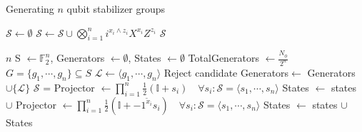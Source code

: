 \documentclass{standalone}
\begin{document}
\begin{algorithm}
\caption{Generating $n$ qubit stabilizer groups}
\label{alg:gengroups}
\begin{algorithmic}
    \State $\mathcal{S}\leftarrow\emptyset$
        \State $\mathcal{S}\leftarrow\mathcal{S}\cup \bigotimes_{i=1}^{n} i^{x_{i}\wedge z_{i}}X^{x_{i}}Z^{z_{i}}$ 
    \EndFor
    \State \Return $\mathcal{S}$
\EndFunction
\end{algorithmic}
\begin{algorithmic}[1]
\Require $n$ 
\Require {}
\State S $\leftarrow \mathbb{F}_{2}^{n}$, Generators $\leftarrow \emptyset$, States $\leftarrow\emptyset$
\State TotalGenerators $\leftarrow \frac{N_{\phi}}{2^{n}}$ 
    \State $G = \{g_{1},\cdots,g_{n}\}\subseteq S$
        \State $\mathcal{L}\leftarrow \langle g_{1},\cdots,g_{n}\rangle$
            \State Reject candidate
        \EndIf
            \State Generators$\leftarrow$ Generators $\cup \{\mathcal{L}\}$
        \EndIf
    \EndIf
\EndWhile
{}
    \State $\mathcal{S}$ = 
    \State Projector $\leftarrow \prod_{i=1}^{n}\frac{1}{2}\left(\mathbb{I} + s_{i}\right)\quad \forall s_{i}:\mathcal{S}=\langle s_{1},\cdots,s_{n}\rangle$
    \State States $\leftarrow$ states $\cup $ 
        \State Projector $\leftarrow \prod_{i=1}^{n}\frac{1}{2}\left(\mathbb{I} + -1^{\tilde{x}_{i}}s_{i}\right)\quad \forall s_{i}:\mathcal{S}=\langle s_{1},\cdots,s_{n}\rangle$
        \State States $\leftarrow$ states $\cup $ 
    \EndFor
\EndFor
\State \Return States
\end{algorithmic}
\end{algorithm}
\end{document}
